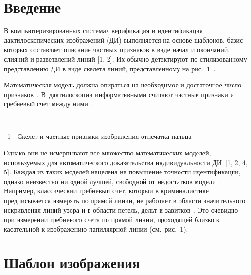       \begin{multicols}{2}

      \label{st\stat}

\section{Введение }

В компьютеризированных системах верификация и идентификация дактилоскопических
изоб\-ра\-жений (ДИ) выполняется на основе шаблонов,\linebreak
 базис которых составляет описание частных
признаков в виде начал и окончаний, слияний и разветвлений линий [1, 2]. Их обычно
детектируют по стилизованному представлению ДИ в виде скелета линий, представленному на
рис.~1~\cite{5gud, 1gud}.


Математическая модель должна опираться на необходимое и достаточное число
признаков~\cite{1gud}. В~дактилоскопии информативными считают частные признаки и
гребневый счет между ними~\cite{5gud}.\linebreak\vspace*{-12pt}
\begin{center} %
\vspace*{18pt}
\mbox{%
\epsfxsize=79.038mm
}
\end{center}
\vspace*{6pt}
{{\figurename~1}\ \ \small{Скелет и частные признаки изображения отпечатка пальца}}


\addtocounter{figure}{1}

\noindent 
Однако они не исчерпывают все множество
математических моделей, используемых для автоматического доказательства индивидуальности
ДИ~[1, 2, 4, 5]. Каждая из таких моделей нацелена на повышение точности
идентификации, однако неизвестно ни одной лучшей, свободной от недостатков
модели~\cite{5gud}. Например, классический гребневый счет, который в криминалистике
предписывается измерять по прямой линии, не работает в об\-ласти значительного искривления
линий узора и в об\-ласти петель, дельт и завитков~\cite{7gud}. Это очевидно при измерении
гребневого счета по прямой линии, проходящей близко к касательной к изображению
папиллярной линии (см.\ рис.~1).

\section{Шаблон изображения}


\end{multicols}
